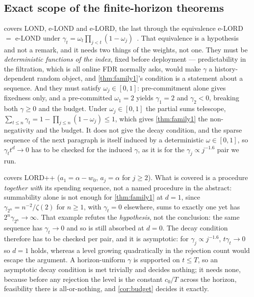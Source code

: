 \documentclass[conference]{IEEEtran}
\begin{document}
\subsection{Exact scope of the finite-horizon theorems}\label{app:horizonscope}

 covers LOND, e-LOND and e-LORD, the last through the equivalence e-LORD $=$ e-LOND
under $\gamma_t=\omega_t\prod_{j<t}(1-\omega_j)$~\cite{egai2025}. That equivalence is a hypothesis and
not a remark, and it needs two things of the weights, not one. They must be \emph{deterministic
functions of the index}, fixed before deployment --- predictability in the filtration, which is all
online FDR normally asks, would make $\gamma$ a history-dependent random object, and
\cref{thm:family1}'s condition is a statement about a sequence. And they must satisfy
$\omega_j\in[0,1]$: pre-commitment alone gives fixedness only, and a pre-committed $\omega_1=2$ yields
$\gamma_1=2$ and $\gamma_2<0$, breaking both $\gamma\ge0$ and the budget. Under
$\omega_j\in[0,1]$ the partial sums telescope, $\sum_{t\le n}\gamma_t=1-\prod_{j\le n}(1-\omega_j)\le1$,
which gives \cref{thm:family1} the non-negativity and the budget. It does not give the decay
condition, and the sparse sequence of the next paragraph is itself induced by a deterministic
$\omega\in[0,1]$, so $\gamma_t t^d\to0$ has to be checked for the induced $\gamma$, as it is for the
$\gamma_j\propto j^{-1.6}$ pair we run.

 covers LORD++ ($a_1=\alpha-w_0$, $a_j=\alpha$ for $j\ge2$). What is covered is a
procedure \emph{together with} its spending sequence, not a named procedure in the abstract:
summability alone is not enough for \cref{thm:family1} at $d=1$, since
$\gamma_{2^n}=n^{-2}/\zeta(2)$ for $n\ge1$, with $\gamma_t=0$ elsewhere, sums to exactly one yet has
$2^n\gamma_{2^n}\to\infty$. That example refutes the \emph{hypothesis}, not the conclusion: the same
sequence has $\gamma_t\to0$ and so is still absorbed at $d=0$. The decay condition therefore has to be
checked per pair, and it is asymptotic: for $\gamma_j\propto j^{-1.6}$, $t\gamma_t\to0$ so $d=1$ holds,
whereas a level growing quadratically in the rejection count would escape the argument. A
horizon-uniform $\gamma$ is supported on $t\le T$, so an asymptotic decay condition is met trivially
and decides nothing; it needs none, because before any rejection the level is the constant $c_0/T$
across the horizon, feasibility there is all-or-nothing, and \cref{cor:budget} decides it exactly.
\end{document}
